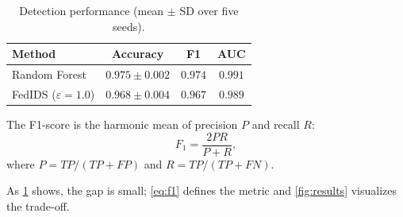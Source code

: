 
\begin{table}[t]
  \centering
  \caption{Detection performance (mean $\pm$ SD over five seeds).}
  \label{tab:results}
  \begin{tabular}{lccc}
    \toprule
    Method & Accuracy & F1 & AUC \\
    \midrule
    Random Forest & $0.975 \pm 0.002$ & $\mathbf{0.974}$ & $\mathbf{0.991}$ \\
    FedIDS ($\varepsilon = 1.0$) & $0.968 \pm 0.004$ & $0.967$ & $0.989$ \\
    \bottomrule
  \end{tabular}
\end{table}

The F1-score is the harmonic mean of precision $P$ and recall $R$:
\begin{equation}
  F_1 = \frac{2PR}{P + R},
  \label{eq:f1}
\end{equation}
where $P = TP/(TP+FP)$ and $R = TP/(TP+FN)$.

As \cref{tab:results} shows, the gap is small; \cref{eq:f1} defines the metric
and \cref{fig:results} visualizes the trade-off.
